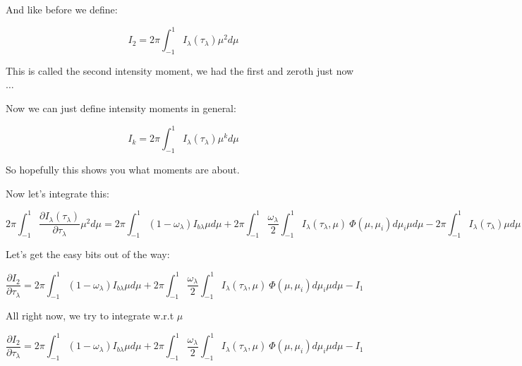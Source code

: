 \documentclass[12pt]{article}
\renewcommand{\_}{\kern-1.5pt\textunderscore\kern-1.5pt}
\begin{document}
\begin{itemize}
And like before we define:\par

 \[ I_{2}=2 \pi  \int _{-1}^{1}I_{ \lambda } \left(  \tau_{ \lambda } \right)  \mu ^{2} d \mu  \] \par

This is called the second intensity moment, we had the first and zeroth just now$ \ldots $ \par

Now we can just define intensity moments in general:\par

 \[ I_{k}=2 \pi   \int _{-1}^{1}I_{ \lambda } \left(  \tau_{ \lambda } \right)  \mu ^{k} d \mu  \] \par

So hopefully this shows you what moments are about. \par

Now let’s integrate this:\par


\vspace{\baselineskip}
 \[ 2 \pi  \int _{-1}^{1}\frac{ \partial I_{ \lambda } \left(  \tau_{ \lambda } \right) }{ \partial  \tau_{ \lambda }} \mu ^{2} d \mu =2 \pi  \int _{-1}^{1} \left( 1- \omega _{ \lambda } \right) I_{b \lambda }  \mu  d \mu +2 \pi  \int _{-1}^{1}\frac{ \omega _{ \lambda }}{2} \int _{-1}^{1}I_{ \lambda } \left(  \tau_{ \lambda }, \mu  \right) ~ \Phi  \left(  \mu , \mu _{i} \right) d \mu _{i} \mu  d \mu -2 \pi  \int _{-1}^{1}I_{ \lambda } \left(  \tau_{ \lambda } \right)  \mu  d \mu  \] \par

Let’s get the easy bits out of the way:\par

 \[ \frac{ \partial I_{2}}{ \partial  \tau_{ \lambda }}=2 \pi  \int _{-1}^{1} \left( 1- \omega _{ \lambda } \right) I_{b \lambda }  \mu  d \mu +2 \pi  \int _{-1}^{1}\frac{ \omega _{ \lambda }}{2} \int _{-1}^{1}I_{ \lambda } \left(  \tau_{ \lambda }, \mu  \right) ~ \Phi  \left(  \mu , \mu _{i} \right) d \mu _{i} \mu  d \mu -I_{1} \] \par


\vspace{\baselineskip}
All right now, we try to integrate w.r.t  \(  \mu  \) \par

 \[ \frac{ \partial I_{2}}{ \partial  \tau_{ \lambda }}=2 \pi  \int _{-1}^{1} \left( 1- \omega _{ \lambda } \right) I_{b \lambda }  \mu  d \mu +2 \pi  \int _{-1}^{1}\frac{ \omega _{ \lambda }}{2} \int _{-1}^{1}I_{ \lambda } \left(  \tau_{ \lambda }, \mu  \right) ~ \Phi  \left(  \mu , \mu _{i} \right) d \mu _{i} \mu  d \mu -I_{1} \] \par


\end{itemize}
\end{document}
